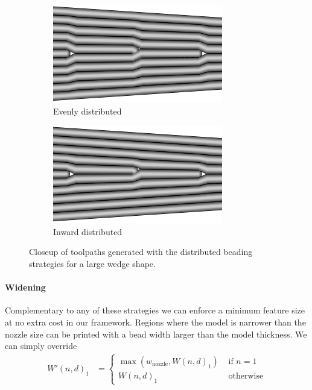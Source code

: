 \begin{figure}
\centering
\setlength{\figwidth}{.45\columnwidth}
\begin{subfigure}{\figwidth}\centering
\includegraphics[width=.8\columnwidth]{sources/validation/wedge_Distributed_pretty_evenly.png}
\caption{Evenly distributed}
\end{subfigure}
\begin{subfigure}{\figwidth}\centering
\includegraphics[width=.8\columnwidth]{sources/validation/wedge_Distributed_pretty_inward.png}
\caption{Inward distributed}
\end{subfigure}
\caption{
Closeup of toolpaths generated with the distributed beading strategies for a large wedge shape.
}
\label{distributed_comparison}
\end{figure}





\paragraph{Widening}
Complementary to any of these strategies we can enforce a minimum feature size at no extra cost in our framework.
Regions where the model is narrower than the nozzle size can be printed with a bead width larger than the model thickness.
We can simply override
\begin{align*}
W'(n,d)_1 &=
\begin{cases}
\max \left( w_\text{nozzle}  ,  W(n,d)_1 \right) & \text{ if } n = 1 \\
W(n,d)_1 & \text{ otherwise}
\end{cases}
\end{align*}




















